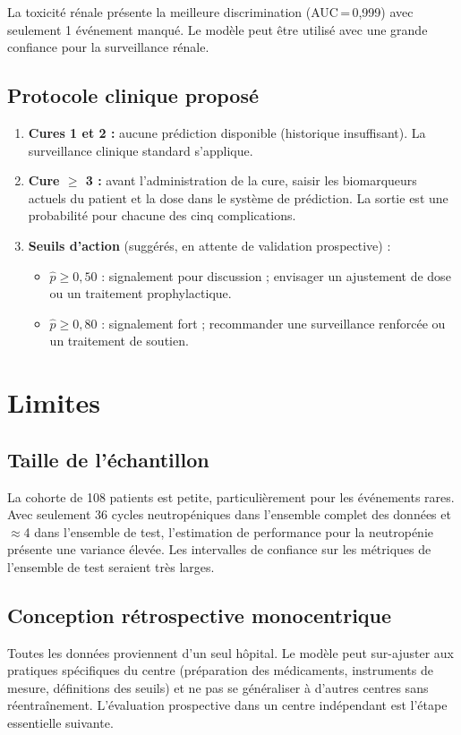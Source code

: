 \documentclass[12pt,a4paper]{report}
\begin{document}
La toxicité rénale présente la meilleure discrimination (AUC\,=\,0,999) avec seulement 1 événement manqué. Le modèle peut être utilisé avec une grande confiance pour la surveillance rénale.

\subsection{Protocole clinique proposé}

\begin{enumerate}
  \item \textbf{Cures 1 et 2 :} aucune prédiction disponible (historique insuffisant). La surveillance clinique standard s'applique.
  \item \textbf{Cure $\geq$ 3 :} avant l'administration de la cure, saisir les biomarqueurs actuels du patient et la dose dans le système de prédiction. La sortie est une probabilité pour chacune des cinq complications.
  \item \textbf{Seuils d'action} (suggérés, en attente de validation prospective) :
    \begin{itemize}
      \item $\hat{p} \geq 0{,}50$ : signalement pour discussion ; envisager un ajustement de dose ou un traitement prophylactique.
      \item $\hat{p} \geq 0{,}80$ : signalement fort ; recommander une surveillance renforcée ou un traitement de soutien.
    \end{itemize}
\end{enumerate}

\section{Limites}

\subsection{Taille de l'échantillon}
La cohorte de 108 patients est petite, particulièrement pour les événements rares. Avec seulement 36 cycles neutropéniques dans l'ensemble complet des données et $\approx$4 dans l'ensemble de test, l'estimation de performance pour la neutropénie présente une variance élevée. Les intervalles de confiance sur les métriques de l'ensemble de test seraient très larges.

\subsection{Conception rétrospective monocentrique}
Toutes les données proviennent d'un seul hôpital. Le modèle peut sur-ajuster aux pratiques spécifiques du centre (préparation des médicaments, instruments de mesure, définitions des seuils) et ne pas se généraliser à d'autres centres sans réentraînement. L'évaluation prospective dans un centre indépendant est l'étape essentielle suivante.
\end{document}
